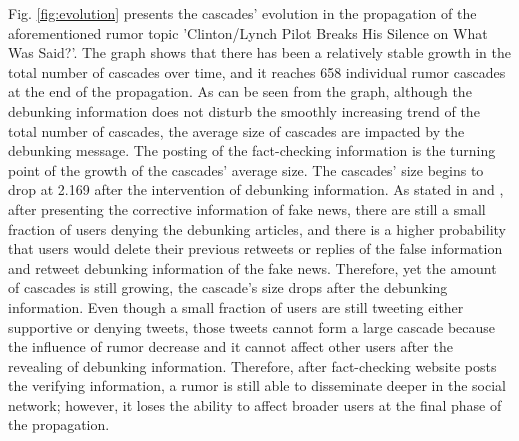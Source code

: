 \documentclass[conference]{IEEEtran}
\begin{document}
	Fig. \ref{fig:evolution} presents the cascades' evolution in the propagation of the aforementioned rumor topic 'Clinton/Lynch Pilot Breaks His Silence on What Was Said?'. The graph shows that there has been a relatively stable growth in the total number of cascades over time, and it reaches 658 individual rumor cascades at the end of the propagation. As can be seen from the graph, although the debunking information does not disturb the smoothly increasing trend of the total number of cascades, the average size of cascades are impacted by the debunking message. The posting of the fact-checking information is the turning point of the growth of the cascades' average size. The cascades' size begins to drop at 2.169 after the intervention of debunking information. As stated in \cite{friggeri2014rumor} and \cite{zubiaga2016analysing}, after presenting the corrective information of fake news, there are still a small fraction of users denying the debunking articles, and there is a higher probability that users would delete their previous retweets or replies of the false information and retweet debunking information of the fake news. Therefore, yet the amount of cascades is still growing, the cascade's size drops after the debunking information. Even though a small fraction of users are still tweeting either supportive or denying tweets, those tweets cannot form a large cascade because the influence of rumor decrease and it cannot affect other users after the revealing of debunking information. Therefore, after fact-checking website posts the verifying information, a rumor is still able to disseminate deeper in the social network; however, it loses the ability to affect broader users at the final phase of the propagation. 
	
\end{document}
